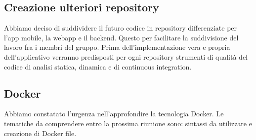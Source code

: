 \subsection*{Creazione ulteriori repository}
Abbiamo deciso di suddividere il futuro codice in repository differenziate per l'app mobile, la webapp e il backend. Questo per facilitare la suddivisione del lavoro fra i membri del gruppo. Prima dell'implementazione vera e propria dell'applicativo verranno predisposti per ogni repository strumenti di qualità del codice di analisi statica, dinamica e di continuous integration.

\subsection*{Docker}
Abbiamo constatato l'urgenza nell'approfondire la tecnologia Docker. Le tematiche da comprendere entro la prossima riunione sono: sintassi da utilizzare e creazione di Docker file.